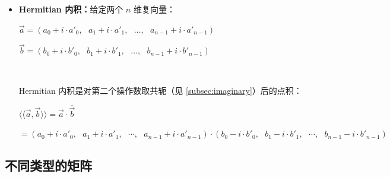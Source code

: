\begin{tcolorbox}[title={\textbf{\tboxdef{\ref*{subsec:vector-arithmetic}} 向量运算}}]
\begin{itemize}
$ $

\item \textbf{Hermitian 内积：}给定两个 $n$ 维复向量：

$\vec{a} = (a_0 + i \cdot a'_0, \text{ } a_1+ i\cdot a'_1, \text{ }\ldots,\text{ }  a_{n-1}+ i\cdot a'_{n-1})$ 

$\vec{b} = (b_0 + i\cdot b'_0, \text{ } b_1 + i\cdot b'_1, \text{ }\ldots, \text{ } b_{n-1} + i\cdot b'_{n-1})$

$ $

Hermitian 内积是对第二个操作数取共轭（见 \autoref{subsec:imaginary}）后的点积：

$\langle\langle \vec{a}, \vec{b} \rangle\rangle =  \vec{a} \cdot \overline{\vec{b}} $

$ = (a_0 + i \cdot a'_0, \text{ } a_1+ i\cdot a'_1, \text{ }\cdots,\text{ } a_{n-1}+ i\cdot a'_{n-1})  \cdot (b_0 - i\cdot b'_0, \text{ } b_1 - i\cdot b'_1, \text{ }\cdots, \text{ } b_{n-1} - i\cdot b'_{n-1})$




\end{itemize}
\end{tcolorbox}




\subsection{不同类型的矩阵}
\label{subsec:vandermonde}



